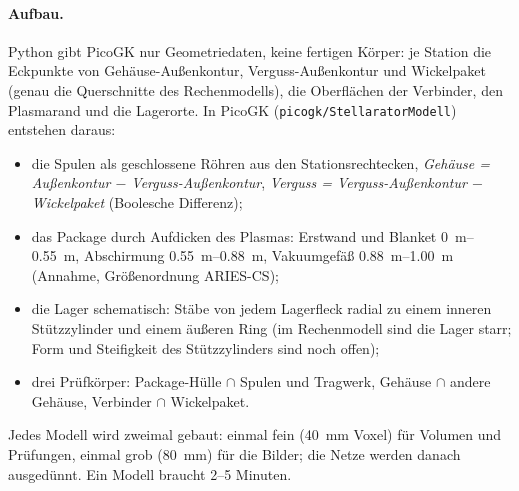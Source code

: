 \documentclass[10pt,a4paper]{article}
\begin{document}
\paragraph{Aufbau.} Python gibt PicoGK nur Geometriedaten, keine fertigen Körper: je Station die Eckpunkte von
Gehäuse-Außenkontur, Verguss-Außenkontur und Wickelpaket (genau die Querschnitte des Rechenmodells), die
Oberflächen der Verbinder, den Plasmarand und die Lagerorte. In PicoGK (\texttt{picogk/StellaratorModell}) entstehen
daraus:
\begin{itemize}\itemsep1pt
\item die Spulen als geschlossene Röhren aus den Stationsrechtecken, \emph{Gehäuse = Außenkontur $-$ Verguss-Außenkontur},
  \emph{Verguss = Verguss-Außenkontur $-$ Wickelpaket} (Boolesche Differenz);
\item das Package durch Aufdicken des Plasmas: Erstwand und Blanket \SIrange{0}{0,55}{m}, Abschirmung
  \SIrange{0,55}{0,88}{m}, Vakuumgefäß \SIrange{0,88}{1,00}{m} (Annahme, Größenordnung ARIES-CS);
\item die Lager schematisch: Stäbe von jedem Lagerfleck radial zu einem inneren Stützzylinder und einem äußeren Ring
  (im Rechenmodell sind die Lager starr; Form und Steifigkeit des Stützzylinders sind noch offen);
\item drei Prüfkörper: Package-Hülle $\cap$ Spulen und Tragwerk, Gehäuse $\cap$ andere Gehäuse, Verbinder $\cap$ Wickelpaket.
\end{itemize}
Jedes Modell wird zweimal gebaut: einmal fein (\SI{40}{mm} Voxel) für Volumen und Prüfungen, einmal grob
(\SI{80}{mm}) für die Bilder; die Netze werden danach ausgedünnt. Ein Modell braucht 2--5 Minuten.

\begin{table}[H]\centering\scriptsize\caption{PicoGK-Modelle: Abweichung der
Voxel-Volumina vom Rechenmodell und Überschneidungen.}\end{table}
\end{document}
